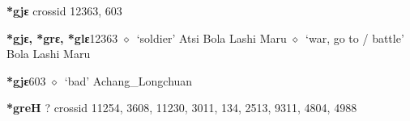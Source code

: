 \item
\textbf{*gjɛ}
  {\tiny crossid 12363, 603}
  \begin{list}{}{\leftmargin=1.5em \itemindent=-1.5em}
  \item {\footnotesize \textbf{*gjɛ, *grɛ, *glɛ}}{\tiny 12363}
         $\diamond$~`soldier'
         Atsi 
\hspace{1ex}
         Bola 
\hspace{1ex}
         Lashi 
\hspace{1ex}
         Maru 
\hspace{1ex}
         $\diamond$~`war, go to / battle'
         Bola 
\hspace{1ex}
         Lashi 
\hspace{1ex}
         Maru 
  \item {\footnotesize \textbf{*gjɛ}}{\tiny 603}
\hspace{1ex}
         $\diamond$~`bad'
         Achang\_Longchuan 
  \end{list}
\item
\textbf{*greH}
?
  {\tiny crossid 11254, 3608, 11230, 3011, 134, 2513, 9311, 4804, 4988}
